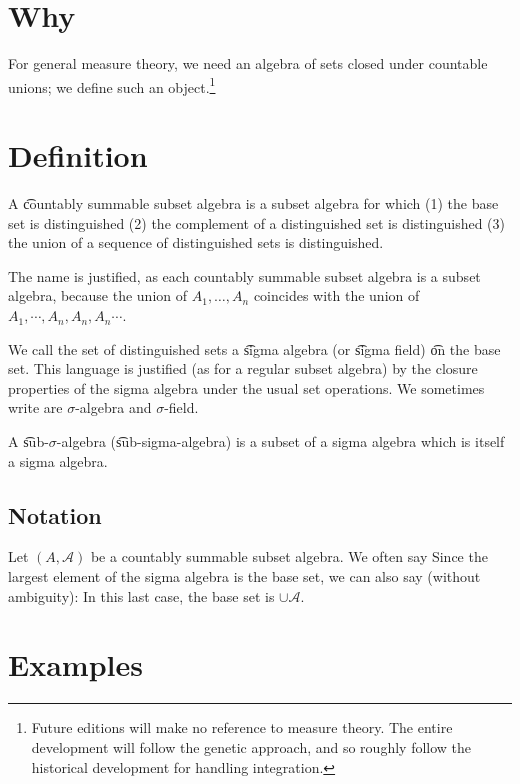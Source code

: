 

\section*{Why}

For general measure theory, we need an algebra of sets closed under countable unions; we define such an object.\footnote{Future editions will make no reference to measure theory. The entire development will follow the genetic approach, and so roughly follow the historical development for handling integration.}

\section*{Definition}

A \t{countably summable subset algebra} is a subset algebra for which (1) the base set is distinguished (2) the complement of a distinguished set is distinguished (3) the union of a sequence of distinguished sets is distinguished.

The name is justified, as each countably summable subset algebra is a subset algebra, because the union of $A_1, \dots , A_n$ coincides with the union of $A_1, \cdots, A_n, A_n, A_n \cdots$.

We call the set of distinguished sets a \t{sigma algebra} (or \t{sigma field}) \t{on} the base set.
This language is justified (as for a regular subset algebra) by the closure properties of the sigma algebra under the usual set operations.
We sometimes write are $\sigma $-algebra and $\sigma $-field.

A \t{sub-$\sigma $-algebra} (\t{sub-sigma-algebra}) is a subset of a sigma algebra which is itself a sigma algebra.

\subsection*{Notation}



Let $(A, \mathcal{A} )$ be a countably summable subset algebra.
We often say 
Since the largest element of the sigma algebra is the base set, we can also say (without ambiguity): 
In this last case, the base set is $\cup \mathcal{A} $.

\section*{Examples}

